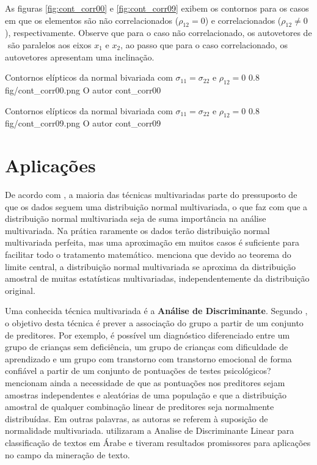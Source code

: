 As figuras \ref{fig:cont_corr00} e \ref{fig:cont_corr09} exibem os contornos para os casos em que os elementos são não correlacionados ($\rho_{12} = 0$) e correlacionados ($\rho_{12} \neq 0$), respectivamente. Observe que para o caso não correlacionado, os autovetores de $\mathbf{}$ são paralelos aos eixos $x_1$ e $x_2$, ao passo que para o caso correlacionado, os autovetores apresentam uma inclinação.

\figura
{Contornos elípticos da normal bivariada com $\sigma_{11} = \sigma_{22}$ e $\rho_{12} = 0$}
{0.8}
{fig/cont_corr00.png}
{O autor}
{cont_corr00}
{}
{}

\figura
{Contornos elípticos da normal bivariada com $\sigma_{11} = \sigma_{22}$ e $\rho_{12} = 0$}
{0.8}
{fig/cont_corr09.png}
{O autor}
{cont_corr09}
{}
{}

\section{Aplicações}

De acordo com \textcite{Furtado1996}, a maioria das técnicas multivariadas parte do pressuposto de que os dados seguem uma distribuição normal multivariada, o que faz com que a distribuição normal multivariada seja de suma importância na análise multivariada. Na prática raramente os dados terão distribuição normal multivariada perfeita, mas uma aproximação em muitos casos é suficiente para facilitar todo o tratamento matemático. \textcite{Furtado1996} menciona que devido ao teorema do limite central, a distribuição normal multivariada se aproxima da distribuição amostral de muitas estatísticas multivariadas, independentemente da distribuição original.

Uma conhecida técnica multivariada é a \textbf{Análise de Discriminante}. Segundo \textcite{Tabachnick2013}, o objetivo desta técnica é prever a associação do grupo a partir de um conjunto de preditores. Por exemplo, é possível um diagnóstico diferenciado entre um grupo de crianças sem deficiência, um grupo de crianças com dificuldade de aprendizado e um grupo com transtorno com transtorno emocional de forma confiável a partir de um conjunto de pontuações de testes psicológicos? \textcite{Tabachnick2013} mencionam ainda a necessidade de que as pontuações nos preditores sejam amostras independentes e aleatórias de uma população e que a distribuição amostral de qualquer combinação linear de preditores seja normalmente distribuídas. Em outras palavras, as autoras se referem à suposição de normalidade multivariada. \textcite{AbuZeina2018} utilizaram a Analise de Discriminante Linear para classificação de textos em Árabe e tiveram resultados promissores para aplicações no campo da mineração de texto.

